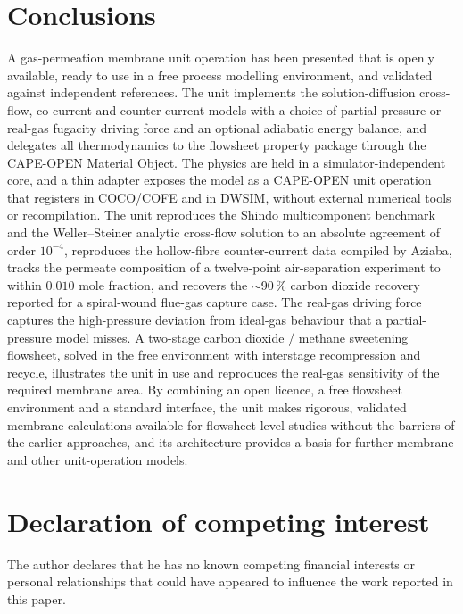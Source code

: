 \documentclass[a4paper,fleqn]{cas-dc}
\begin{document}
\section{Conclusions}\label{sec:conclusions}
A gas-permeation membrane unit operation has been presented that is openly
available, ready to use in a free process modelling environment, and validated
against independent references. The unit implements the solution-diffusion
cross-flow, co-current and counter-current models with a choice of
partial-pressure or real-gas fugacity driving force and an optional adiabatic
energy balance, and delegates all thermodynamics to the flowsheet property
package through the CAPE-OPEN Material Object. The physics are held in a
simulator-independent core, and a thin adapter exposes the model as a CAPE-OPEN
unit operation that registers in COCO/COFE and in DWSIM,
without external numerical tools or recompilation. The unit
reproduces the Shindo multicomponent benchmark and the Weller--Steiner analytic
cross-flow solution to an absolute agreement of order $10^{-4}$, reproduces the
hollow-fibre counter-current data compiled by Aziaba, tracks the permeate
composition of a twelve-point air-separation experiment to within $0.010$ mole
fraction, and recovers the $\sim$90\,\% carbon dioxide recovery reported for a
spiral-wound flue-gas capture case. The real-gas driving force captures the high-pressure deviation
from ideal-gas behaviour that a partial-pressure model misses. A two-stage carbon
dioxide / methane sweetening flowsheet, solved in the free environment with
interstage recompression and recycle, illustrates the unit in use and reproduces
the real-gas sensitivity of the required membrane area. By combining an
open licence, a free flowsheet environment and a standard interface, the unit
makes rigorous, validated membrane calculations available for flowsheet-level
studies without the barriers of the earlier approaches, and its architecture
provides a basis for further membrane and other unit-operation models.

\printcredits

\section*{Declaration of competing interest}
The author declares that he has no known competing financial interests or personal
relationships that could have appeared to influence the work reported in this paper.
\end{document}
